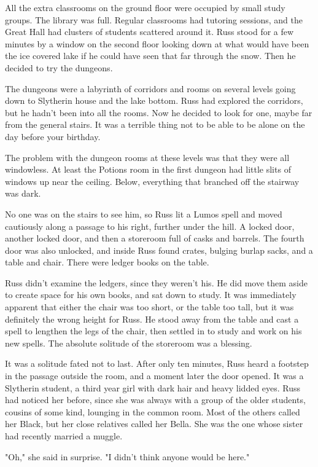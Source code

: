 \documentclass[a4paper,11pt]{article}
\begin{document}
All the extra classrooms on the ground floor were occupied by small study groups. The library was full. Regular classrooms had tutoring sessions, and the Great Hall had clusters of students scattered around it. Russ stood for a few minutes by a window on the second floor looking down at what would have been the ice covered lake if he could have seen that far through the snow. Then he decided to try the dungeons.

The dungeons were a labyrinth of corridors and rooms on several levels going down to Slytherin house and the lake bottom. Russ had explored the corridors, but he hadn't been into all the rooms. Now he decided to look for one, maybe far from the general stairs. It was a terrible thing not to be able to be alone on the day before your birthday.

The problem with the dungeon rooms at these levels was that they were all windowless. At least the Potions room in the first dungeon had little slits of windows up near the ceiling. Below, everything that branched off the stairway was dark.

No one was on the stairs to see him, so Russ lit a Lumos spell and moved cautiously along a passage to his right, further under the hill. A locked door, another locked door, and then a storeroom full of casks and barrels. The fourth door was also unlocked, and inside Russ found crates, bulging burlap sacks, and a table and chair. There were ledger books on the table.

Russ didn't examine the ledgers, since they weren't his. He did move them aside to create space for his own books, and sat down to study. It was immediately apparent that either the chair was too short, or the table too tall, but it was definitely the wrong height for Russ. He stood away from the table and cast a spell to lengthen the legs of the chair, then settled in to study and work on his new spells. The absolute solitude of the storeroom was a blessing.

It was a solitude fated not to last. After only ten minutes, Russ heard a footstep in the passage outside the room, and a moment later the door opened. It was a Slytherin student, a third year girl with dark hair and heavy lidded eyes. Russ had noticed her before, since she was always with a group of the older students, cousins of some kind, lounging in the common room. Most of the others called her Black, but her close relatives called her Bella. She was the one whose sister had recently married a muggle.

"Oh," she said in surprise. "I didn't think anyone would be here."
\end{document}
